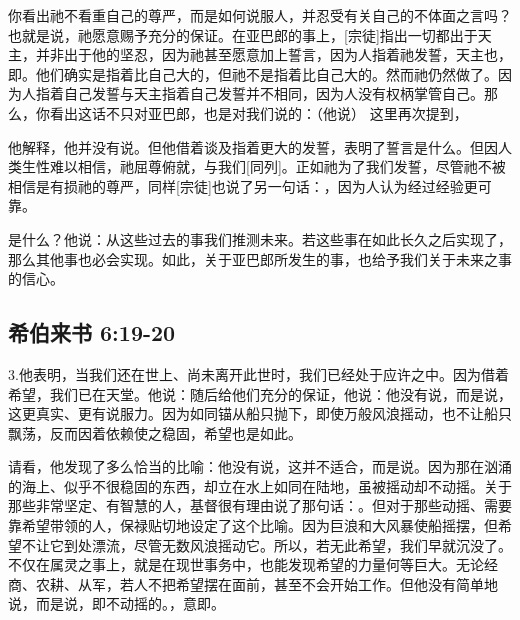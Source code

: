 你看出祂不看重自己的尊严，而是如何说服人，并忍受有关自己的不体面之言吗？也就是说，祂愿意赐予充分的保证。在亚巴郎的事上，[宗徒]指出一切都出于天主，并非出于他的坚忍，因为祂甚至愿意加上誓言，因为人指着祂发誓，天主也，即。他们确实是指着比自己大的，但祂不是指着比自己大的。然而祂仍然做了。因为人指着自己发誓与天主指着自己发誓并不相同，因为人没有权柄掌管自己。那么，你看出这话不只对亚巴郎，也是对我们说的：（他说） 这里再次提到，\par

他解释，他并没有说。但他借着谈及指着更大的发誓，表明了誓言是什么。但因人类生性难以相信，祂屈尊俯就，与我们[同列]。正如祂为了我们发誓，尽管祂不被相信是有损祂的尊严，同样[宗徒]也说了另一句话：，因为人认为经过经验更可靠。\par

是什么？他说：从这些过去的事我们推测未来。若这些事在如此长久之后实现了，那么其他事也必会实现。如此，关于亚巴郎所发生的事，也给予我们关于未来之事的信心。\par


\subsection{希伯来书 6:19-20}

3.\newline{}他表明，当我们还在世上、尚未离开此世时，我们已经处于应许之中。因为借着希望，我们已在天堂。他说：随后给他们充分的保证，他说：他没有说，而是说，这更真实、更有说服力。因为如同锚从船只抛下，即使万般风浪摇动，也不让船只飘荡，反而因着依赖使之稳固，希望也是如此。\par

请看，他发现了多么恰当的比喻：他没有说，这并不适合，而是说。因为那在汹涌的海上、似乎不很稳固的东西，却立在水上如同在陆地，虽被摇动却不动摇。关于那些非常坚定、有智慧的人，基督很有理由说了那句话：。但对于那些动摇、需要靠希望带领的人，保禄贴切地设定了这个比喻。因为巨浪和大风暴使船摇摆，但希望不让它到处漂流，尽管无数风浪摇动它。所以，若无此希望，我们早就沉没了。不仅在属灵之事上，就是在现世事务中，也能发现希望的力量何等巨大。无论经商、农耕、从军，若人不把希望摆在面前，甚至不会开始工作。但他没有简单地说，而是说，即不动摇的。，意即。\par

